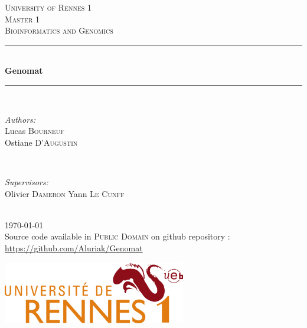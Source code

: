 \documentclass[]{report} %
\begin{document}
\begin{titlepage}
\newcommand{\HRule}{\rule{\linewidth}{0.5mm}}
\center
\textsc{\LARGE University of Rennes 1}\\[1.5cm]
\textsc{\large Master 1}\\[0.5cm] 
\textsc{\Large Bioinformatics and Genomics}\\[0.5cm] 


\HRule \\[0.4cm]
{ \huge \bfseries Genomat}\\[0.4cm] %
\HRule \\[1.5cm]
 

\begin{minipage}{0.4\textwidth}
\begin{flushleft} \large
\emph{Authors:}\\
Lucas \textsc{Bourneuf}\\
Ostiane	\textsc{D'Augustin}
\end{flushleft}
\end{minipage}
~
\begin{minipage}{0.4\textwidth}
\begin{flushright} \large
\emph{Supervisors:} \\
Olivier \textsc{Dameron}
Yann \textsc{Le Cunff}\\
\end{flushright}
\end{minipage}\\[2cm]

{\large \today}\\[1cm] %

Source code available in \textsc{Public Domain} on github repository :\\ \url{https://github.com/Aluriak/Genomat}

\vspace{1cm}
\includegraphics[width=0.6\textwidth]{rennes1_logo.png}\\[1cm] %

\end{titlepage}
\end{document}
